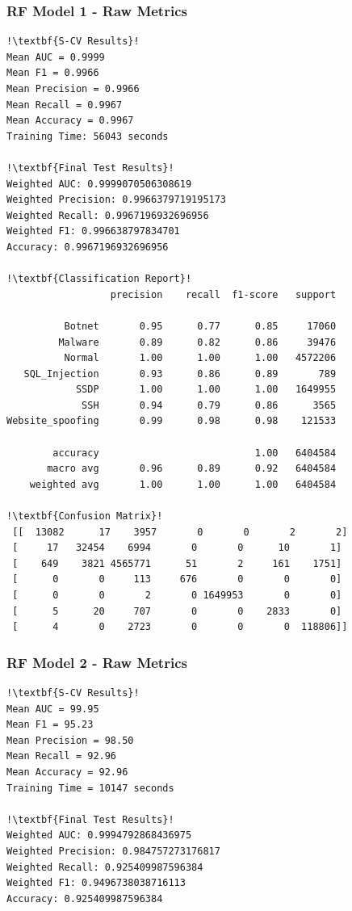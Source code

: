 \begin{appendices}
\newpage
\subsubsection{RF Model 1 - Raw Metrics}
\begin{lstlisting}[escapechar=!]
!\textbf{S-CV Results}!
Mean AUC = 0.9999
Mean F1 = 0.9966
Mean Precision = 0.9966
Mean Recall = 0.9967
Mean Accuracy = 0.9967
Training Time: 56043 seconds

!\textbf{Final Test Results}!
Weighted AUC: 0.9999070506308619
Weighted Precision: 0.9966379719195173
Weighted Recall: 0.9967196932696956
Weighted F1: 0.996638797834701
Accuracy: 0.9967196932696956

!\textbf{Classification Report}!
                  precision    recall  f1-score   support

          Botnet       0.95      0.77      0.85     17060
         Malware       0.89      0.82      0.86     39476
          Normal       1.00      1.00      1.00   4572206
   SQL_Injection       0.93      0.86      0.89       789
            SSDP       1.00      1.00      1.00   1649955
             SSH       0.94      0.79      0.86      3565
Website_spoofing       0.99      0.98      0.98    121533

        accuracy                           1.00   6404584
       macro avg       0.96      0.89      0.92   6404584
    weighted avg       1.00      1.00      1.00   6404584
    
!\textbf{Confusion Matrix}!    
 [[  13082      17    3957       0       0       2       2]
 [     17   32454    6994       0       0      10       1]
 [    649    3821 4565771      51       2     161    1751]
 [      0       0     113     676       0       0       0]
 [      0       0       2       0 1649953       0       0]
 [      5      20     707       0       0    2833       0]
 [      4       0    2723       0       0       0  118806]]
\end{lstlisting}

\newpage
\subsubsection{RF Model 2 - Raw Metrics}
\begin{lstlisting}[escapechar=!]
!\textbf{S-CV Results}!
Mean AUC = 99.95
Mean F1 = 95.23
Mean Precision = 98.50
Mean Recall = 92.96
Mean Accuracy = 92.96
Training Time = 10147 seconds

!\textbf{Final Test Results}!
Weighted AUC: 0.9994792868436975
Weighted Precision: 0.984757273176817
Weighted Recall: 0.925409987596384
Weighted F1: 0.9496738038716113
Accuracy: 0.925409987596384


\end{lstlisting}
\end{appendices}
